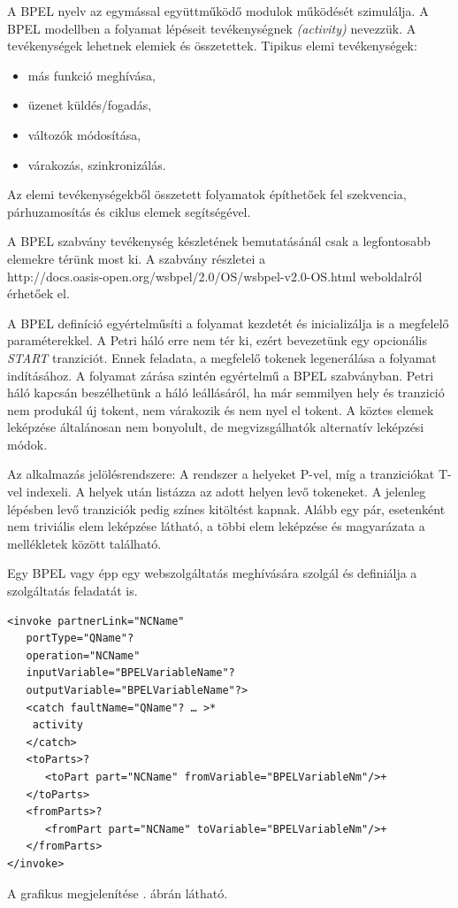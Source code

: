 

A BPEL nyelv az egymással együttműködő modulok működését szimulálja. A BPEL  modellben a folyamat lépéseit tevékenységnek \textsl{(activity)} nevezzük. A tevékenységek lehetnek elemiek és összetettek. Tipikus elemi tevékenységek:
\begin{itemize}
\item más funkció meghívása,
\item üzenet küldés/fogadás,
\item változók módosítása,
\item várakozás, szinkronizálás.
\end{itemize}
Az elemi tevékenységekből összetett folyamatok építhetőek fel szekvencia, párhuzamosítás és ciklus elemek segítségével.

A BPEL szabvány tevékenység készletének bemutatásánál csak a legfontosabb elemekre térünk most ki. A szabvány részletei a \\
http://docs.oasis-open.org/wsbpel/2.0/OS/wsbpel-v2.0-OS.html weboldalról érhetőek el. 

A BPEL definíció egyértelműsíti a folyamat kezdetét és inicializálja is a megfelelő paraméterekkel. A Petri háló erre nem tér ki, ezért bevezetünk egy opcionális \textit{START} tranziciót. Ennek feladata, a megfelelő tokenek legenerálása a folyamat indításához. A folyamat zárása szintén egyértelmű a BPEL szabványban. Petri háló kapcsán beszélhetünk a háló leállásáról, ha már semmilyen hely és tranzició nem produkál új tokent, nem várakozik és nem nyel el tokent. A köztes elemek leképzése általánosan nem bonyolult, de megvizsgálhatók alternatív leképzési módok. 

Az alkalmazás jelölésrendszere: A rendszer a helyeket P-vel, míg a tranziciókat T-vel indexeli. A helyek után listázza az adott helyen levő tokeneket. A jelenleg lépésben levő tranziciók pedig színes kitöltést kapnak. Alább egy pár, esetenként nem triviális elem leképzése látható, a többi elem leképzése és magyarázata a mellékletek között található.

Egy BPEL vagy épp egy webszolgáltatás meghívására szolgál és definiálja a szolgáltatás feladatát is. 
\begin{verbatim}
<invoke partnerLink="NCName"
   portType="QName"?
   operation="NCName"
   inputVariable="BPELVariableName"?
   outputVariable="BPELVariableName"?>
   <catch faultName="QName"? … >*
  	activity
   </catch>
   <toParts>?
      <toPart part="NCName" fromVariable="BPELVariableNm"/>+
   </toParts>
   <fromParts>?
      <fromPart part="NCName" toVariable="BPELVariableNm"/>+
   </fromParts>
</invoke>
\end{verbatim}
A grafikus megjelenítése . ábrán látható.

